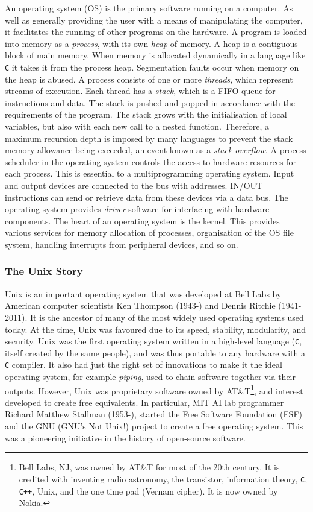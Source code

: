 \documentclass[11pt]{amsart}
\begin{document}
An operating system (OS) is the primary software running on a computer. As well as generally providing the user with a means of manipulating the computer, it facilitates the running of other programs on the hardware. A program is loaded into memory as a \emph{process}, with its own \emph{heap} of memory. A heap is a contiguous block of main memory. When memory is allocated dynamically in a language like \texttt{C} it takes it from the process heap. Segmentation faults occur when memory on the heap is abused. A process consists of one or more \emph{threads}, which represent streams of execution. Each thread has a \emph{stack}, which is a FIFO queue for instructions and data. The stack is pushed and popped in accordance with the requirements of the program. The stack grows with the initialisation of local variables, but also with each new call to a nested function. Therefore, a maximum recursion depth is imposed by many languages to prevent the stack memory allowance being exceeded, an event known as a \emph{stack overflow}. A process scheduler in the operating system controls the access to hardware resources for each process. This is essential to a multiprogramming operating system. Input and output devices are connected to the bus with addresses. IN/OUT instructions can send or retrieve data from these devices via a data bus. The operating system provides \emph{driver} software for interfacing with hardware components. The heart of an operating system is the kernel. This provides various services for memory allocation of processes, organisation of the OS file system, handling interrupts from peripheral devices, and so on.

\subsubsection{The Unix Story}

Unix is an important operating system that was developed at Bell Labs by American computer scientists Ken Thompson (1943-) and Dennis Ritchie (1941-2011). It is the ancestor of many of the most widely used operating systems used today. At the time, Unix was favoured due to its speed, stability, modularity, and security. Unix was the first operating system written in a high-level language (\texttt{C}, itself created by the same people), and was thus portable to any hardware with a \texttt{C} compiler. It also had just the right set of innovations to make it the ideal operating system, for example \emph{piping}, used to chain software together via their outputs. However, Unix was proprietary software owned by AT\&T\footnote{Bell Labs, NJ, was owned by AT\&T for most of the 20th century. It is credited with inventing radio astronomy, the transistor, information theory, \texttt{C}, \texttt{C++}, Unix, and the one time pad (Vernam cipher). It is now owned by Nokia.}, and interest developed to create free equivalents. In particular, MIT AI lab programmer Richard Matthew Stallman (1953-), started the Free Software Foundation (FSF) and the GNU (GNU's Not Unix!) project to create a free operating system. This was a pioneering initiative in the history of open-source software.
\end{document}
